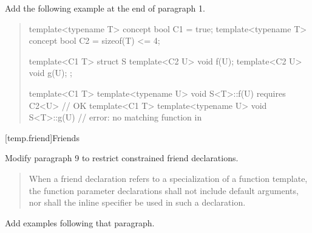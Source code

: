 Add the following example at the end of paragraph 1.

\begin{quote}
\begin{addedblock}
\enterexample
\begin{codeblock}
template<typename T> concept bool C1 = true;
template<typename T> concept bool C2 = sizeof(T) <= 4;

template<C1 T>
  struct S {
    template<C2 U> void f(U);
    template<C2 U> void g(U);
  };

template<C1 T> template<typename U> 
  void S<T>::f(U) requires C2<U> { } // OK
template<C1 T> template<typename U> 
  void S<T>::g(U) { }                // error: no matching function in 
\end{codeblock}
\exitexample
\end{addedblock}
\end{quote}


\setcounter{subsection}{3}
[temp.friend]{Friends}

Modify paragraph 9 to restrict constrained friend declarations.

\begin{quote}
\setcounter{Paras}{8}
\pnum
When a friend declaration refers to a specialization of a function
template, the function parameter declarations shall not include
default arguments,  nor shall the inline specifier be used in such a
declaration.
\end{quote}

Add examples following that paragraph.

